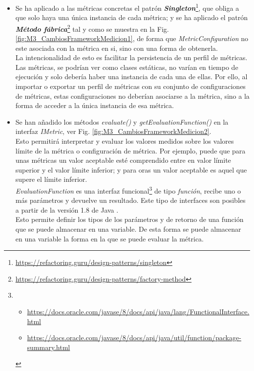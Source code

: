 \begin{itemize}
	\tightlist
	\item Se ha aplicado a las métricas concretas el patrón \textit{\textbf{Singleton}}\footnote{\url{https://refactoring.guru/design-patterns/singleton}}, que obliga a que solo haya una única instancia de cada métrica; y se ha aplicado el patrón \textit{\textbf{Método fábrica}}\footnote{\url{https://refactoring.guru/design-patterns/factory-method}} tal y como se muestra en la Fig. \ref{fig:M3_CambiosFrameworkMedicion1}, de forma que \textit{MetricConfiguration} no este asociada con la métrica en si, sino con una forma de obtenerla.\\
	La intencionalidad de esto es facilitar la persistencia de un perfil de métricas. Las métricas, se podrían ver como clases estáticas, no varían en tiempo de ejecución y solo debería haber una instancia de cada una de ellas. Por ello, al importar o exportar un perfil de métricas con su conjunto de configuraciones de métricas, estas configuraciones no deberían asociarse a la métrica, sino a la forma de acceder a la única instancia de esa métrica. 
	\item Se han añadido los métodos \textit{evaluate()} y \textit{getEvaluationFunction()} en la interfaz \textit{IMetric}, ver Fig. \ref{fig:M3_CambiosFrameworkMedicion2}.\\
	Esto permitirá interpretar y evaluar los valores medidos sobre los valores límite de la métrica o configuración de métrica. Por ejemplo, puede que para unas métricas un valor aceptable esté comprendido entre en valor límite superior y el valor límite inferior; y para oras un valor aceptable es aquel que supere el límite inferior.\\
	\textit{EvaluationFunction} es una interfaz funcional\footnote{
		\begin{itemize}
			\tightlist
			\item \url{https://docs.oracle.com/javase/8/docs/api/java/lang/FunctionalInterface.html}
			\item \url{https://docs.oracle.com/javase/8/docs/api/java/util/function/package-summary.html}
		\end{itemize}} 
	de tipo \textit{función}, recibe uno o más parámetros y devuelve un resultado. Este tipo de interfaces son posibles a partir de la versión 1.8 de Java \citep{noauthor_functionalinterface_nodate}.\\
	Esto permite definir los tipos de los parámetros y de retorno de una función que se puede almacenar en una variable. De esta forma se puede almacenar en una variable la forma en la que se puede evaluar la métrica.
\end{itemize}


